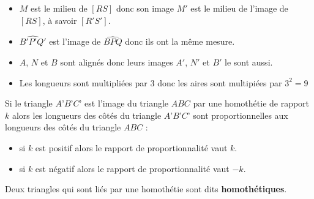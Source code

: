\begin{exemple*1}

    \begin{itemize}
        \item $M$ est le milieu de $[RS]$ donc son image $M'$ est le milieu de l'image de $[RS]$, à savoir $[R'S']$.
        \item $\widehat{B'P'Q'}$ est l'image de $\widehat{BPQ}$ donc ils ont la même mesure.
        \item $A$, $N$ et $B$ sont alignés donc leurs images $A'$, $N'$ et $B'$ le sont aussi.
        \item Les longueurs sont multipliées par $3$ donc les aires sont multipiées par $3^2=9$
    \end{itemize}
\end{exemple*1}

\begin{propriete}[\admise]
    Si le triangle $A’B’C’$ est l’image du triangle $ABC$ par une homothétie de rapport $k$ alors les longueurs des côtés du triangle $A’B’C’$ sont proportionnelles aux longueurs des côtés du triangle $ABC$ :
    \begin{itemize}
        \item si $k$ est positif alors le rapport de proportionnalité vaut $k$.
        \item si $k$ est négatif alors le rapport de proportionnalité vaut $-k$.
    \end{itemize}
\end{propriete}

\begin{remarque}
    Deux triangles qui sont liés par une homothétie sont dits \textbf{homothétiques}.

\end{remarque}